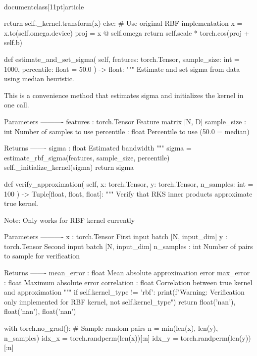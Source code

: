 \\documentclass[11pt]{article}
\begin{document}
\begin{CodeBlock}
            return self._kernel.transform(x)
        else:
            # Use original RBF implementation
            x = x.to(self.omega.device)
            proj = x @ self.omega
            return self.scale * torch.cos(proj + self.b)
    
    def estimate_and_set_sigma(
        self,
        features: torch.Tensor,
        sample_size: int = 1000,
        percentile: float = 50.0
    ) -> float:
        """
        Estimate and set sigma from data using median heuristic.
        
        This is a convenience method that estimates sigma and initializes
        the kernel in one call.
        
        Parameters
        ----------
        features : torch.Tensor
            Feature matrix [N, D]
        sample_size : int
            Number of samples to use
        percentile : float
            Percentile to use (50.0 = median)
        
        Returns
        -------
        sigma : float
            Estimated bandwidth
        """
        sigma = estimate_rbf_sigma(features, sample_size, percentile)
        self._initialize_kernel(sigma)
        return sigma
    
    def verify_approximation(
        self, 
        x: torch.Tensor, 
        y: torch.Tensor, 
        n_samples: int = 100
    ) -> Tuple[float, float, float]:
        """
        Verify that RKS inner products approximate true kernel.
        
        Note: Only works for RBF kernel currently
        
        Parameters
        ----------
        x : torch.Tensor
            First input batch [N, input_dim]
        y : torch.Tensor
            Second input batch [N, input_dim]
        n_samples : int
            Number of pairs to sample for verification
        
        Returns
        -------
        mean_error : float
            Mean absolute approximation error
        max_error : float
            Maximum absolute error
        correlation : float
            Correlation between true kernel and approximation
        """
        if self.kernel_type != 'rbf':
            print(f"Warning: Verification only implemented for RBF kernel, not {self.kernel_type}")
            return float('nan'), float('nan'), float('nan')
        
        with torch.no_grad():
            # Sample random pairs
            n = min(len(x), len(y), n_samples)
            idx_x = torch.randperm(len(x))[:n]
            idx_y = torch.randperm(len(y))[:n]
            

\end{CodeBlock}
\end{document}
